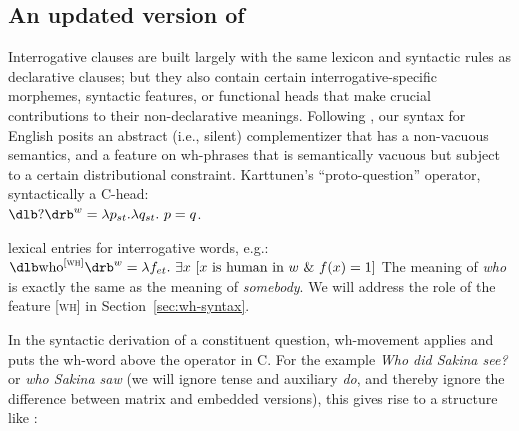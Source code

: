 \subsection{An updated version of \cite{karttunen-1977-questions}}%
\label{sec:karttunen-1977}

Interrogative clauses are built largely with the same lexicon and syntactic
rules as declarative clauses; but they also contain certain
interrogative-specific morphemes, syntactic features, or functional heads that
make crucial contributions to their non-declarative meanings. Following
\cite{karttunen-1977-questions}, our syntax for English posits an abstract
(i.e., silent) complementizer that has a non-vacuous semantics, and a feature on
wh-phrases that is semantically vacuous but subject to a certain distributional
constraint.
%
%
\ex\label{ex:?}%
Karttunen's ``proto-question'' operator, syntactically a C-head:\\
$\sv{?}^{w} = \lambda p_{st}.\lambda q_{st}.\ p=q$.
\xe

\ex lexical entries for interrogative words, e.g.:\\
$\sv{\text{who}^{[\textsc{wh}]}}^{w} = \lambda f_{et}.\ \exists x\ [x\ \text{is
  human in}\ w\ \&\ f(x)=1]$
\xe
%
The meaning of \emph{who} is exactly the same as the meaning of \emph{somebody}.
We will address the role of the feature [\textsc{wh}] in
Section~\ref{sec:wh-syntax}.

In the syntactic derivation of a constituent question, wh-movement applies and
puts the wh-word above the operator in C. For the example \emph{Who did Sakina
  see?} or \emph{who Sakina saw} (we will ignore tense and auxiliary \emph{do},
and thereby ignore the difference between matrix and embedded versions), this
gives rise to a structure like \Next:

